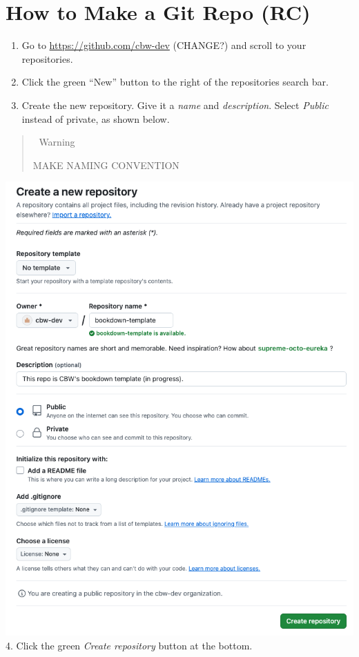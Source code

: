 \documentclass[
]{book}
\theoremstyle{definition}
\theoremstyle{definition}
\theoremstyle{definition}
\theoremstyle{definition}
\theoremstyle{remark}
\begin{document}
\section{How to Make a Git Repo (RC)}\label{how-to-make-a-git-repo-rc}

\begin{enumerate}
\def\labelenumi{\arabic{enumi}.}
\item
  Go to \url{https://github.com/cbw-dev} (CHANGE?) and scroll to your repositories.
\item
  Click the green ``New'' button to the right of the repositories search bar.
\item
  Create the new repository. Give it a \emph{name} and \emph{description}. Select \emph{Public} instead of private, as shown below.
\end{enumerate}

\begin{quote}
🚧 Warning

MAKE NAMING CONVENTION
\end{quote}

\includegraphics{img/git-instruct/create-git-repo.png}
4. Click the green \emph{Create repository} button at the bottom.
\end{document}
